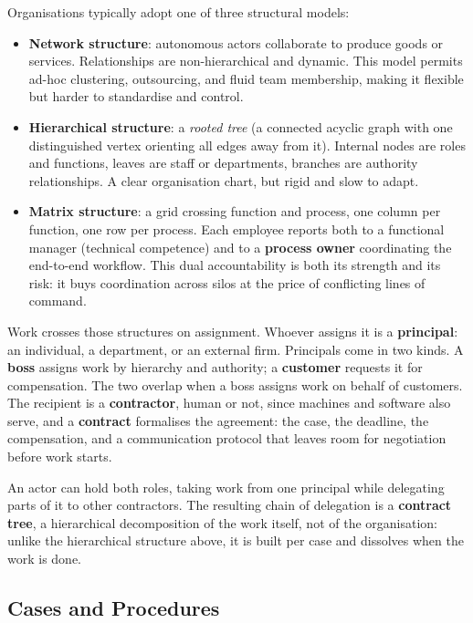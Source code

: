 Organisations typically adopt one of three structural models:

\begin{itemize}
  \item \textbf{Network structure}: autonomous actors collaborate to produce goods or services. Relationships are non-hierarchical and dynamic. This model permits ad-hoc clustering, outsourcing, and fluid team membership, making it flexible but harder to standardise and control.

  \item \textbf{Hierarchical structure}: a \emph{rooted tree} (a connected acyclic graph with one distinguished vertex orienting all edges away from it). Internal nodes are roles and functions, leaves are staff or departments, branches are authority relationships. A clear organisation chart, but rigid and slow to adapt.

  \item \textbf{Matrix structure}: a grid crossing function and process, one column per function, one row per process. Each employee reports both to a functional manager (technical competence) and to a \textbf{process owner} coordinating the end-to-end workflow. This dual accountability is both its strength and its risk: it buys coordination across silos at the price of conflicting lines of command.
\end{itemize}

Work crosses those structures on assignment. Whoever assigns it is a \textbf{principal}: an individual, a department, or an external firm. Principals come in two kinds. A \textbf{boss} assigns work by hierarchy and authority; a \textbf{customer} requests it for compensation. The two overlap when a boss assigns work on behalf of customers. The recipient is a \textbf{contractor}, human or not, since machines and software also serve, and a \textbf{contract} formalises the agreement: the case, the deadline, the compensation, and a communication protocol that leaves room for negotiation before work starts.

An actor can hold both roles, taking work from one principal while delegating parts of it to other contractors. The resulting chain of delegation is a \textbf{contract tree}, a hierarchical decomposition of the work itself, not of the organisation: unlike the hierarchical structure above, it is built per case and dissolves when the work is done.

\subsection{Cases and Procedures}

